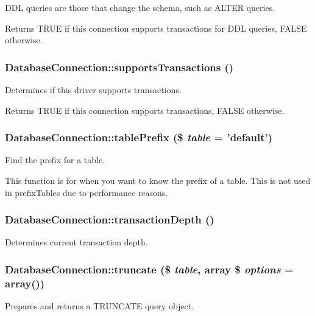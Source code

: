 DDL queries are those that change the schema, such as ALTER queries.

\begin{DoxyReturn}{Returns}
TRUE if this connection supports transactions for DDL queries, FALSE otherwise. 
\end{DoxyReturn}
\hypertarget{classDatabaseConnection_a6f5f74fd00cad354a98cea3ddef509a9}{
\subsubsection[{supportsTransactions}]{\setlength{\rightskip}{0pt plus 5cm}DatabaseConnection::supportsTransactions ()}}
\label{classDatabaseConnection_a6f5f74fd00cad354a98cea3ddef509a9}
Determines if this driver supports transactions.

\begin{DoxyReturn}{Returns}
TRUE if this connection supports transactions, FALSE otherwise. 
\end{DoxyReturn}
\hypertarget{classDatabaseConnection_af9ed26d47fbfce2a25c443c0e73295d7}{
\subsubsection[{tablePrefix}]{\setlength{\rightskip}{0pt plus 5cm}DatabaseConnection::tablePrefix (\$ {\em table} = {\ttfamily 'default'})}}
\label{classDatabaseConnection_af9ed26d47fbfce2a25c443c0e73295d7}
Find the prefix for a table.

This function is for when you want to know the prefix of a table. This is not used in prefixTables due to performance reasons. \hypertarget{classDatabaseConnection_a6b2631c56f4951032f30a7c519a4837e}{
\subsubsection[{transactionDepth}]{\setlength{\rightskip}{0pt plus 5cm}DatabaseConnection::transactionDepth ()}}
\label{classDatabaseConnection_a6b2631c56f4951032f30a7c519a4837e}
Determines current transaction depth. \hypertarget{classDatabaseConnection_a24e86882227b5b337daedcf20458e371}{
\subsubsection[{truncate}]{\setlength{\rightskip}{0pt plus 5cm}DatabaseConnection::truncate (\$ {\em table}, \/  array \$ {\em options} = {\ttfamily array()})}}
\label{classDatabaseConnection_a24e86882227b5b337daedcf20458e371}
Prepares and returns a TRUNCATE query object.


